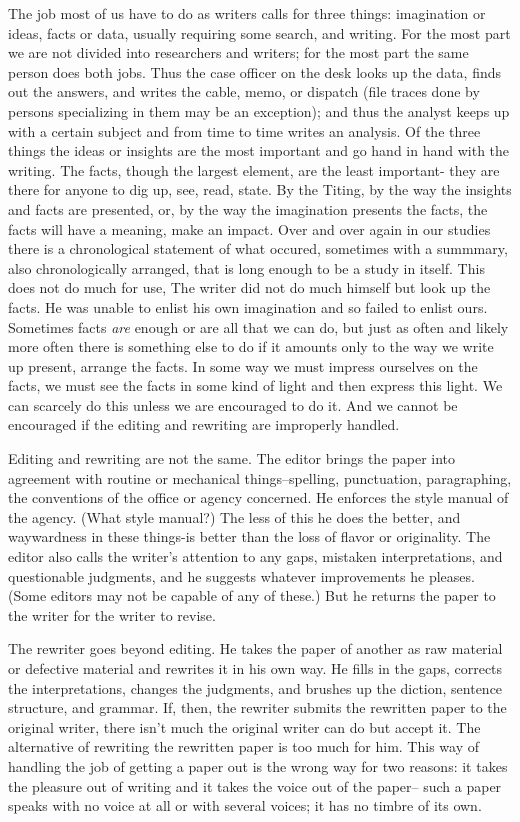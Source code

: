 \documentclass[
    oneside,
    11pt,
    draft
]{memoir}
\begin{document}
The job most of us have to do as writers calls for three things: imagination or ideas, facts or data, usually requiring some search, and writing. For the most part we are not divided into researchers and writers; for the most part the same person does both jobs. Thus the case officer on the desk looks up the data, finds out the answers, and writes the cable, memo, or dispatch (file traces done by persons specializing in them may be an exception); and thus the analyst keeps up with a certain subject and from time to time writes an analysis. Of the three things the ideas or insights are the most important and go hand in hand with the writing. The facts, though the largest element, are the least important- they are there for anyone to dig up, see, read, state. By the Titing, by the way the insights and facts are presented, or, by the way the imagination presents the facts, the facts will have a meaning, make an impact. Over and over again in our studies there is a chronological statement of what occured, sometimes with a summmary, also chronologically arranged, that is long enough to be a study in itself. This does not do much for use, The writer did not do much himself but look up the facts. He was unable to enlist his own imagination and so failed to enlist ours. Sometimes facts \emph{are} enough or are all that we can do, but just as often and likely more often there is something else to do if it amounts only to the way we write up present, arrange the facts. In some way we must impress ourselves on the facts, we must see the facts in some kind of light and then express this light. We can scarcely do this unless we are encouraged to do it. And we cannot be encouraged if the editing and rewriting are improperly handled. 

Editing and rewriting are not the same. The editor brings the paper into agreement with routine or mechanical things--spelling, punctuation, paragraphing, the conventions of the office or agency concerned. He enforces the style manual of the agency. (What style manual?) The less of this he does the better, and waywardness in these things-is better than the loss of flavor or originality. The editor also calls the writer's attention to any gaps, mistaken interpretations, and questionable judgments, and he suggests whatever improvements he pleases. (Some editors may not be capable of any of these.) But he returns the paper to the writer for the writer to revise. 

The rewriter goes beyond editing. He takes the paper of another as raw material or defective material and rewrites it in his own way. He fills in the gaps, corrects the interpretations, changes the judgments, and brushes up the diction, sentence structure, and grammar. If, then, the rewriter submits the rewritten paper to the original writer, there isn't much the original writer can do but accept it. The alternative of rewriting the rewritten paper is too much for him. This way of handling the job of getting a paper out is the wrong way for two reasons: it takes the pleasure out of writing and it takes the voice out of the paper-- such a paper speaks with no voice at all or with several voices; it has no timbre of its own.
\end{document}
